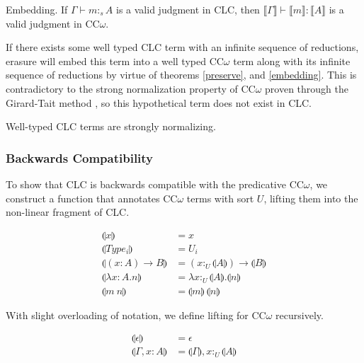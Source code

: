 \documentclass[sigplan,screen,review,authordraft]{acmart}
\newcommand{\utype}{:_{\scriptscriptstyle U}}
\newcommand{\stype}[1]{:_#1}
\newcommand{\erase}[1]{\llbracket #1 \rrbracket}
\newcommand{\lift}[1]{\llparenthesis #1 \rrparenthesis}
\begin{document}
\begin{theorem} \label{embedding}
  Embedding. If $\Gamma \vdash m \stype{s} A$ is a valid judgment in CLC, then $\erase{\Gamma} \vdash \erase{m} : \erase{A}$ is a valid judgment in CC$\omega$.
\end{theorem}

If there exists some well typed CLC term with an infinite sequence of reductions, erasure will embed this term into a well typed CC$\omega$ term along with its infinite sequence of reductions by virtue of theorems \ref{preserve}, and \ref{embedding}. This is contradictory to the strong normalization property of CC$\omega$ proven through the Girard-Tait method \cite{ecc}, so this hypothetical term does not exist in CLC.

\begin{theorem}
  Well-typed CLC terms are strongly normalizing.
\end{theorem}

\subsubsection{Backwards Compatibility}
To show that CLC is backwards compatible with the predicative CC$\omega$, we construct a function that annotates CC$\omega$ terms with sort $U$, lifting them into the non-linear fragment of CLC.

\begin{definition}
  \begin{align*}
    \lift{x}                     & = x                                        \\
    \lift{Type_i}                & = U_i                                      \\
    \lift{(x : A) \rightarrow B} & = (x \utype \lift{A}) \rightarrow \lift{B} \\
    \lift{\lambda x : A.n}       & = \lambda x\utype\lift{A}.\lift{n}         \\
    \lift{m\ n}                  & = \lift{m}\ \lift{n}
  \end{align*}
\end{definition}

With slight overloading of notation, we define lifting for CC$\omega$ recursively.
\begin{definition}
  \begin{align*}
    \lift{\epsilon}      & = \epsilon                         \\
    \lift{\Gamma, x : A} & = \lift{\Gamma}, x \utype \lift{A}
  \end{align*}
\end{definition}
\end{document}
